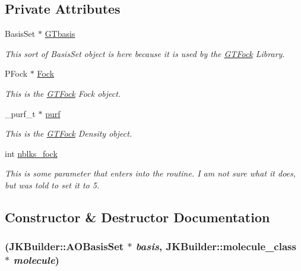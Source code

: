 \subsection*{Private Attributes}
\begin{DoxyCompactItemize}
\item 
BasisSet $\ast$ \hyperlink{classGTFock_1_1DistGTFock_acf01612812393db2711417ca40f2d629}{GTbasis}
\begin{DoxyCompactList}\small\item\em This sort of BasisSet object is here because it is used by the \hyperlink{namespaceGTFock}{GTFock} Library. \item\end{DoxyCompactList}\item 
PFock $\ast$ \hyperlink{classGTFock_1_1DistGTFock_a4d2250740bf39e3a0f585c264a79f902}{Fock}
\begin{DoxyCompactList}\small\item\em This is the \hyperlink{namespaceGTFock}{GTFock} Fock object. \item\end{DoxyCompactList}\item 
\_\-purf\_\-t $\ast$ \hyperlink{classGTFock_1_1DistGTFock_a67a350742753030caf0b3e66027d6d4b}{purf}
\begin{DoxyCompactList}\small\item\em This is the \hyperlink{namespaceGTFock}{GTFock} Density object. \item\end{DoxyCompactList}\item 
int \hyperlink{classGTFock_1_1DistGTFock_a13c5e6c87e46d3ddac36125f8c824736}{nblks\_\-fock}
\begin{DoxyCompactList}\small\item\em This is some parameter that enters into the routine. I am not sure what it does, but was told to set it to 5. \item\end{DoxyCompactList}\end{DoxyCompactItemize}


\subsection{Constructor \& Destructor Documentation}
\hypertarget{classGTFock_1_1DistGTFock_a98b483024f3677552f2fca216363b66d}{
\subsubsection[{DistGTFock}]{ ({\bf JKBuilder::AOBasisSet} $\ast$ {\em basis}, \/  {\bf JKBuilder::molecule\_\-class} $\ast$ {\em molecule})}}
\label{classGTFock_1_1DistGTFock_a98b483024f3677552f2fca216363b66d}


